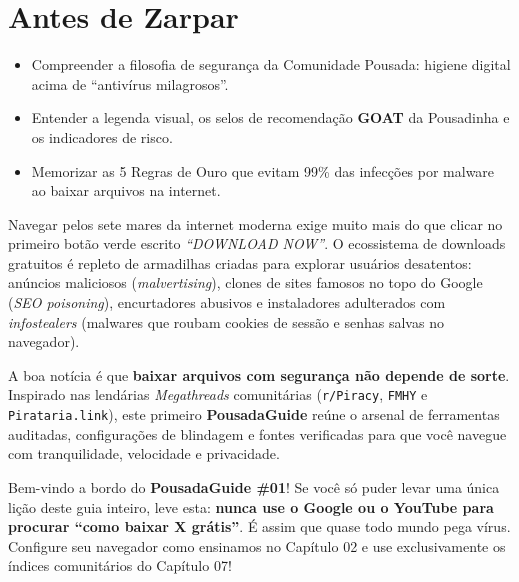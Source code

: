 \documentclass{pousadaguide}
\begin{document}
\capa
\tableofcontents

\chapter{Antes de Zarpar}

\begin{missao}
\begin{itemize}
  \item Compreender a filosofia de segurança da Comunidade Pousada: higiene digital acima de ``antivírus milagrosos''.
  \item Entender a legenda visual, os selos de recomendação \textbf{GOAT} da Pousadinha e os indicadores de risco.
  \item Memorizar as 5 Regras de Ouro que evitam 99\% das infecções por malware ao baixar arquivos na internet.
\end{itemize}
\end{missao}

Navegar pelos sete mares da internet moderna exige muito mais do que clicar no primeiro botão verde escrito \emph{``DOWNLOAD NOW''}. O ecossistema de downloads gratuitos é repleto de armadilhas criadas para explorar usuários desatentos: anúncios maliciosos (\emph{malvertising}), clones de sites famosos no topo do Google (\emph{SEO poisoning}), encurtadores abusivos e instaladores adulterados com \emph{infostealers} (malwares que roubam cookies de sessão e senhas salvas no navegador).

A boa notícia é que \textbf{baixar arquivos com segurança não depende de sorte}. Inspirado nas lendárias \emph{Megathreads} comunitárias (\texttt{r/Piracy}, \texttt{FMHY} e \texttt{Pirataria.link}), este primeiro \textbf{PousadaGuide} reúne o arsenal de ferramentas auditadas, configurações de blindagem e fontes verificadas para que você navegue com tranquilidade, velocidade e privacidade.

\begin{pousadinha}
Bem-vindo a bordo do \textbf{PousadaGuide \#01}! Se você só puder levar uma única lição deste guia inteiro, leve esta: \textbf{nunca use o Google ou o YouTube para procurar ``como baixar X grátis''}. É assim que quase todo mundo pega vírus. Configure seu navegador como ensinamos no Capítulo 02 e use exclusivamente os índices comunitários do Capítulo 07!
\end{pousadinha}
\end{document}
